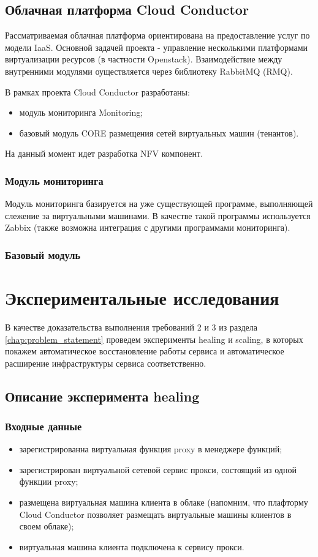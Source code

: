 \documentclass[oneside,final,14pt,a4paper]{extreport}
\begin{document}
\section{Облачная платформа Cloud Conductor}
Рассматриваемая облачная платформа ориентирована на предоставление услуг по модели IaaS. Основной задачей проекта - управление несколькими платформами виртуализации ресурсов (в частности Openstack). Взаимодействие между внутренними модулями оуществляется через библиотеку RabbitMQ (RMQ).

В рамках проекта Cloud Conductor разработаны:
\begin{itemize}
	\item модуль мониторинга Monitoring;
	\item базовый модуль CORE размещения сетей виртуальных машин (тенантов).
\end{itemize}

На данный момент идет разработка NFV компонент.

\subsection{Модуль мониторинга}
Модуль мониторинга базируется на уже существующей программе, выполняющей слежение за виртуальными машинами. В качестве такой программы используется Zabbix (также возможна интеграция с другими программами мониторинга).

\subsection{Базовый модуль }





\chapter{Экспериментальные исследования}
В качестве доказательства выполнения требований 2 и 3 из раздела \ref{chap:problem_statement} проведем эксперименты healing и scaling, в которых покажем автоматическое восстановление работы сервиса и автоматическое расширение инфраструктуры сервиса соответственно.

\section{Описание эксперимента healing}
\subsection{Входные данные}
\begin{itemize}
	\item зарегистрированна виртуальная функция proxy в менеджере функций;
	\item зарегистрирован виртуальной сетевой сервис прокси, состоящий из одной функции proxy;
	\item размещена виртуальная машина клиента в облаке (напомним, что плафторму Cloud Conductor позволяет размещать виртуальные машины клиентов в своем облаке);
	\item виртуальная машина клиента подключена к сервису прокси.
\end{itemize}
\end{document}
